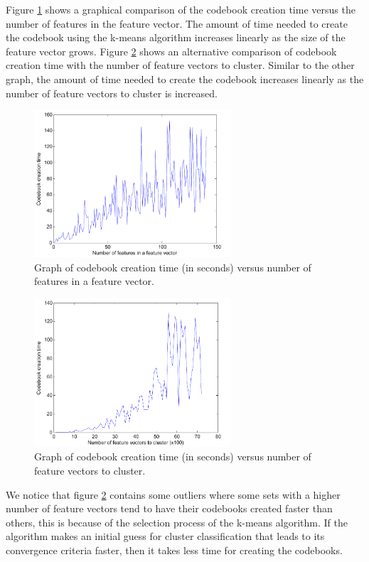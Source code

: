 \documentclass[]{report}   %
\begin{document}
Figure \ref{fig:codebookoverhead1} shows a graphical comparison of the codebook creation time versus the number of features in the feature vector. The amount of time needed to create the codebook using the k-means algorithm increases linearly as the size of the feature vector grows. Figure \ref{fig:codebookoverhead2} shows an alternative comparison of codebook creation time with the number of feature vectors to cluster. Similar to the other graph, the amount of time needed to create the codebook increases linearly as the number of feature vectors to cluster is increased.
\begin{figure}[htbp]
	\centering
		\includegraphics[width=0.65\textwidth]{codebookoverhead.pdf}
	\caption{Graph of codebook creation time (in seconds) versus number of features in a feature vector.}
	\label{fig:codebookoverhead1}
\end{figure}
\begin{figure}[htbp]
	\centering
		\includegraphics[width=0.65\textwidth]{codebookoverhead2.pdf}
	\caption{Graph of codebook creation time (in seconds) versus number of feature vectors to cluster.}
	\label{fig:codebookoverhead2}
\end{figure}
We notice that figure \ref{fig:codebookoverhead2} contains some outliers where some sets with a higher number of feature vectors tend to have their codebooks created faster than others, this is because of the selection process of the k-means algorithm. If the algorithm makes an initial guess for cluster classification that leads to its convergence criteria faster, then it takes less time for creating the codebooks.
\end{document}
